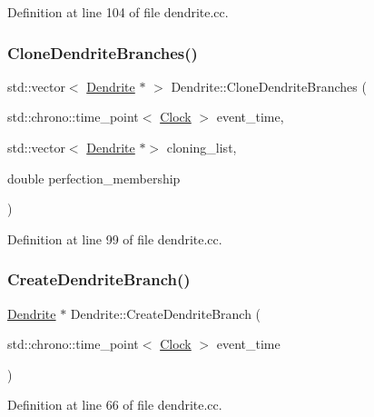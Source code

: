 Definition at line 104 of file dendrite.\+cc.

\mbox{\label{class_dendrite_abd67c09df69c520e6720bca2592bcc99}} 
\subsubsection{\texorpdfstring{Clone\+Dendrite\+Branches()}{CloneDendriteBranches()}}
{\footnotesize\ttfamily std\+::vector$<$ \mbox{\hyperlink{class_dendrite}{Dendrite}} $\ast$ $>$ Dendrite\+::\+Clone\+Dendrite\+Branches (\begin{DoxyParamCaption}\item[{std\+::chrono\+::time\+\_\+point$<$ \mbox{\hyperlink{universe_8h_a0ef8d951d1ca5ab3cfaf7ab4c7a6fd80}{Clock}} $>$}]{event\+\_\+time,  }\item[{std\+::vector$<$ \mbox{\hyperlink{class_dendrite}{Dendrite}} $\ast$$>$}]{cloning\+\_\+list,  }\item[{double}]{perfection\+\_\+membership }\end{DoxyParamCaption})}



Definition at line 99 of file dendrite.\+cc.

\mbox{\label{class_dendrite_ac7b30397a4753f9c37e96ed716e275eb}} 
\subsubsection{\texorpdfstring{Create\+Dendrite\+Branch()}{CreateDendriteBranch()}}
{\footnotesize\ttfamily \mbox{\hyperlink{class_dendrite}{Dendrite}} $\ast$ Dendrite\+::\+Create\+Dendrite\+Branch (\begin{DoxyParamCaption}\item[{std\+::chrono\+::time\+\_\+point$<$ \mbox{\hyperlink{universe_8h_a0ef8d951d1ca5ab3cfaf7ab4c7a6fd80}{Clock}} $>$}]{event\+\_\+time }\end{DoxyParamCaption})}



Definition at line 66 of file dendrite.\+cc.

